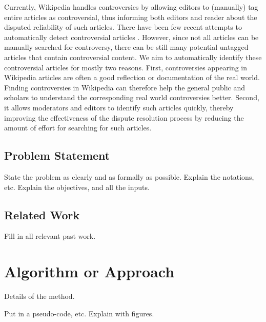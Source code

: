 \documentclass[twocolumn]{article}
\newcommand{\comment}[1]{}
\begin{document}
	Currently, Wikipedia handles controversies by allowing editors to (manually) tag entire articles as controversial, thus informing both editors and reader about the disputed reliability of such articles. There have been few recent attempts to automatically detect controversial articles \cite{Kittur:2007:HSS:1240624.1240698} \cite{conf/wsdm/VuongLSLL08} \cite{conf/ht/RadMRB12}. However, since not all articles can be manually searched for controversy, there can be still many potential untagged articles that contain controversial content. We aim to automatically identify these controversial articles for mostly two reasons. First, controversies appearing in Wikipedia articles are often a good reflection or documentation of the real world. Finding controversies in Wikipedia can therefore help the general public and scholars to understand the corresponding real world controversies better. Second, it allows moderators and editors to identify such articles quickly, thereby improving the effectiveness of the dispute resolution process by reducing the amount of effort for searching for such articles. \\

\subsection{Problem Statement}

State the problem as clearly and as formally as possible.
Explain the notations, etc.
Explain the objectives, and all the inputs.

\subsection{Related Work}

Fill in all relevant past work.

\comment{

Can also comment out paragraphs, etc.

}

\section{Algorithm or Approach}

Details of the method.

Put in a pseudo-code, etc.
Explain with figures.

\comment{

Use the following format for figures:

\begin{figure}[t]
	\centering
	\texttt{[image: figure\_file]}
	\caption{This figure explains this.}
	\label{fig:block}
\end{figure}

And refer as Figure \ref{fig:block}.

}
\end{document}
